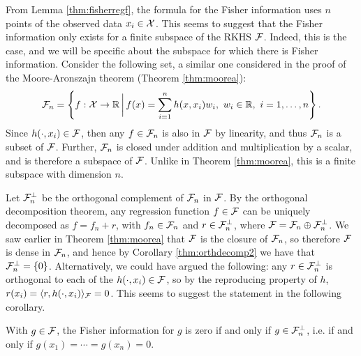 From Lemma \ref{thm:fisherregf}, the formula for the Fisher information uses $n$ points of the observed data $x_i\in{\mathcal X}$.
This seems to suggest that the Fisher information only exists for a finite subspace of the RKHS ${\mathcal F}$.
Indeed, this is the case, and we will be specific about the subspace for which there is Fisher information.
Consider the following set, a similar one considered in the proof of the Moore-Aronszajn theorem (Theorem \ref{thm:moorea}):
\begin{align}\label{eq:subspaceFn}
{\mathcal F}_n = \left\{ f:{\mathcal X} \to \mathbb{R} \, \bigg| \, f(x) = \sum_{i=1}^n h(x,x_i)w_i, \ w_i \in \mathbb{R}, \ i=1,\dots,n \right\}.  
\end{align}
Since $h(\cdot,x_i) \in {\mathcal F}$, then any $f \in {\mathcal F}_n$ is also in ${\mathcal F}$ by linearity, and thus ${\mathcal F}_n$ is a subset of ${\mathcal F}$.
Further, ${\mathcal F}_n$ is closed under addition and multiplication by a scalar, and is therefore a subspace of ${\mathcal F}$.
Unlike in Theorem \ref{thm:moorea}, this is a finite subspace with dimension $n$.

Let ${\mathcal F}_n^\bot$ be the orthogonal complement of ${\mathcal F}_n$ in ${\mathcal F}$.
By the orthogonal decomposition theorem, any regression function $f\in{\mathcal F}$ can be uniquely decomposed as $f = f_n + r$, with $f_n \in {\mathcal F}_n$ and $r \in {\mathcal F}_n^\bot$, where $\mathcal F = \mathcal F_n \oplus  {\mathcal F}_n^\bot$.
We saw earlier in Theorem \ref{thm:moorea} that ${\mathcal F}$ is the closure of ${\mathcal F}_n$, so therefore ${\mathcal F}$ is dense in ${\mathcal F}_n$, and hence by Corollary \ref{thm:orthdecomp2} we have that ${\mathcal F}_n^\bot = \{0\}$.
Alternatively, we could have argued the following: any $r \in {\mathcal F}_n^\bot$ is orthogonal to each of the $h(\cdot,x_i)\in{\mathcal F}$, so by the reproducing property of $h$, $r(x_i) = \langle r,h(\cdot,x_i)\rangle_{\mathcal F} = 0$.
This seems to suggest the statement in the following corollary.

\begin{corollary}
  With $g \in {\mathcal F}$, the Fisher information for $g$ is zero if and only if $g\in{\mathcal F}_n^\bot$, i.e. if and only if $g(x_1) = \cdots = g(x_n) = 0$.
\end{corollary}

